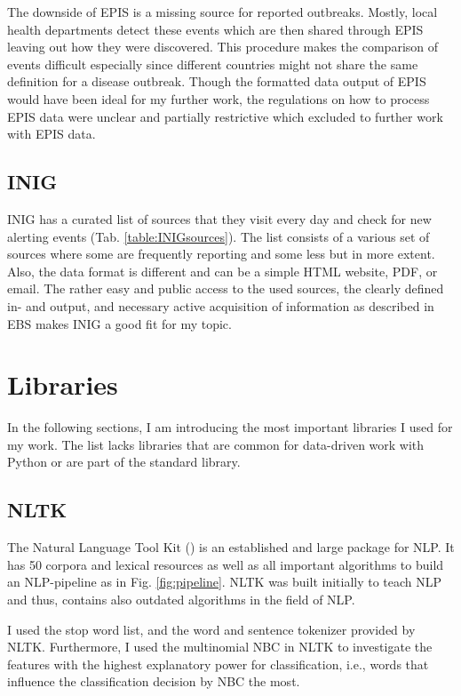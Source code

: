   The downside of EPIS is a missing source for reported outbreaks.
  Mostly, local health departments detect these events which are then shared through EPIS leaving out how they were discovered.
  This procedure makes the comparison of events difficult especially since different countries might not share the same definition for a disease outbreak.
  Though the formatted data output of EPIS would have been ideal for my further work, the regulations on how to process EPIS data were unclear and partially restrictive which excluded to further work with EPIS data.

\subsection{INIG}\label{INIGsources}
  INIG has a curated list of sources that they visit every day and check for new alerting events (Tab. \ref{table:INIGsources}).
  The list consists of a various set of sources where some are frequently reporting and some less but in more extent.
  Also, the data format is different and can be a simple HTML website, PDF, or email.
  The rather easy and public access to the used sources, the clearly defined in- and output, and necessary active acquisition of information as described in EBS makes INIG a good fit for my topic.

\section{Libraries}
  In the following sections, I am introducing the most important libraries I used for my work.
  The list lacks libraries that are common for data-driven work with Python or are part of the standard library.

\subsection{NLTK}
  The Natural Language Tool Kit () is an established and large package for NLP.
  It has 50 corpora and lexical resources as well as all important algorithms to build an NLP-pipeline as in Fig. \ref{fig:pipeline}.
  NLTK was built initially to teach NLP and thus, contains also outdated algorithms in the field of NLP.

  I used the stop word list, and the word and sentence tokenizer provided by NLTK.
  Furthermore, I used the multinomial NBC in NLTK to investigate the features with the highest explanatory power for classification, i.e., words that influence the classification decision by NBC the most.

